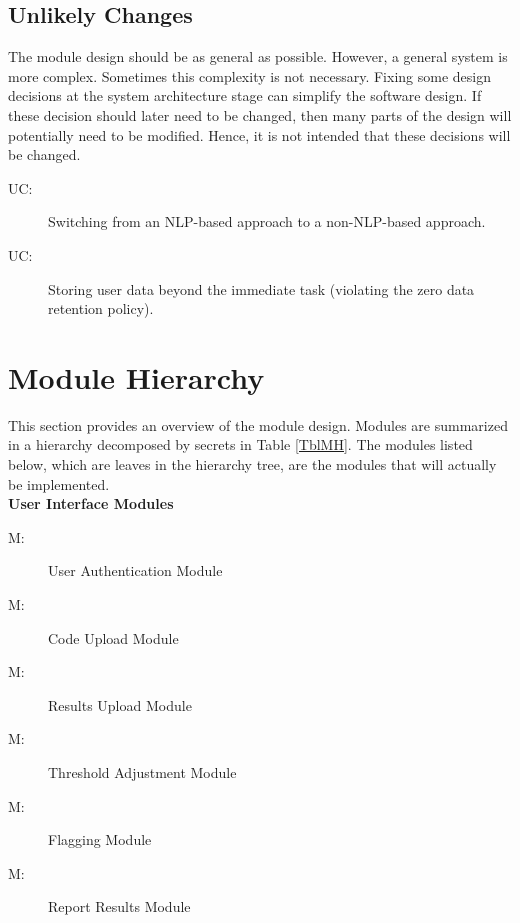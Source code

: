\documentclass[12pt, titlepage]{article}
\newcounter{ucnum}
\newcommand{\uctheucnum}{UC\theucnum}
\newcounter{mnum}
\newcommand{\mthemnum}{M\themnum}
\begin{document}

\subsection{Unlikely Changes} \label{SecUchange}

The module design should be as general as possible. However, a general system is
more complex. Sometimes this complexity is not necessary. Fixing some design
decisions at the system architecture stage can simplify the software design. If
these decision should later need to be changed, then many parts of the design
will potentially need to be modified. Hence, it is not intended that these
decisions will be changed.

\begin{description}
  \item[ \uctheucnum \label{ucNLP}:] Switching from an NLP-based approach to a non-NLP-based approach.
  \item[ \uctheucnum \label{ucDataRetention}:] Storing user data beyond the immediate task (violating the zero data retention policy).
\end{description}

\section{Module Hierarchy} \label{SecMH}

This section provides an overview of the module design. Modules are summarized
in a hierarchy decomposed by secrets in Table \ref{TblMH}. The modules listed
below, which are leaves in the hierarchy tree, are the modules that will
actually be implemented. \\

\textbf{User Interface Modules}
\begin{description}
  \item [ \mthemnum \label{mAuth}:] User Authentication Module
  \item [ \mthemnum \label{mCodeUpload}:] Code Upload Module
  \item [ \mthemnum \label{mResultsUpload}:] Results Upload Module
  \item [ \mthemnum \label{mThreshold}:] Threshold Adjustment Module
  \item [ \mthemnum \label{mFlagging}:] Flagging Module
  \item [ \mthemnum \label{mResults}:] Report Results Module
\end{description}
\end{document}
